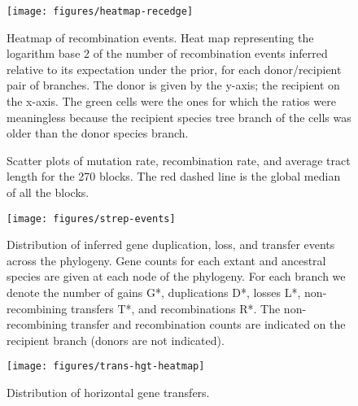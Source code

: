 \documentclass[english]{article}
\newcommand{\lyxdot}{.}
\begin{document}
\begin{figure}
\texttt{[image: figures/heatmap-recedge]}
\caption{\label{fig:Heatmap-of-recombination}Heatmap of recombination events.
Heat map representing the logarithm base 2 of the number of recombination
events inferred relative to its expectation under the prior, for each
donor/recipient pair of branches. The donor is given by the y-axis;
the recipient on the x-axis.  The
green cells were the ones for which the ratios were meaningless because
the recipient species tree branch of the cells was older than the
donor species branch.}
\end{figure}
\clearpage{}%

\begin{figure}


\caption{\label{fig:scatter3}Scatter plots of mutation rate, recombination
rate, and average tract length for the 270 blocks. The red dashed
line is the global median of all the blocks.}
\end{figure}
\clearpage{}%


\begin{figure}
\texttt{[image: figures/strep-events]}
\caption{\label{fig:Gene-duplication-loss} Distribution of inferred
  gene duplication, loss, and transfer events across the phylogeny.
  Gene counts for each extant and ancestral species are given at each
  node of the phylogeny.  For each branch we denote the number of gains
  G*, duplications D*, losses L*, non-recombining transfers T*, and 
  recombinations R*.  The non-recombining transfer and recombination counts
  are indicated on the recipient branch (donors are not indicated).}
\end{figure}
\clearpage{}%

\begin{figure}
\begin{center}
\texttt{[image: figures/trans-hgt-heatmap]}
\end{center}
\vspace{-1.2in}
\caption{Distribution of horizontal gene transfers.}
\label{fig:hgt-heatmap}
\end{figure}
\end{document}
